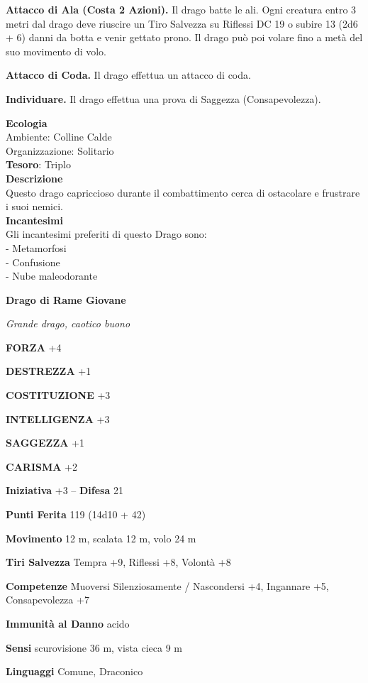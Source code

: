 \begin{multicols}{2}
\textbf{Attacco di Ala (Costa 2 Azioni).} Il drago batte le ali. Ogni creatura entro 3 metri dal drago deve riuscire un Tiro Salvezza su Riflessi DC 19 o subire 13 (2d6 + 6) danni da botta e venir gettato prono. Il drago può poi volare fino a metà del suo movimento di volo.

\textbf{Attacco di Coda.} Il drago effettua un attacco di coda.

\textbf{Individuare.} Il drago effettua una prova di Saggezza (Consapevolezza).

\textbf{Ecologia}\\
Ambiente: Colline Calde\\
Organizzazione: Solitario\\
\textbf{Tesoro}: Triplo\\
\textbf{Descrizione}\\
Questo drago capriccioso durante il combattimento cerca di ostacolare e frustrare i suoi nemici.\\
\textbf{Incantesimi}\\
Gli incantesimi preferiti di questo Drago sono:\\
- Metamorfosi\\
- Confusione\\
- Nube maleodorante


\medskip{}\textbf{Drago di Rame Giovane}

\textit{Grande drago, caotico buono}

\textbf{FORZA} +4

\textbf{DESTREZZA} +1

\textbf{COSTITUZIONE} +3

\textbf{INTELLIGENZA} +3

\textbf{SAGGEZZA} +1

\textbf{CARISMA} +2

\textbf{Iniziativa} +3 -- \textbf{Difesa} 21

\textbf{Punti Ferita} 119 (14d10 + 42)

\textbf{Movimento} 12 m, scalata 12 m, volo 24 m

\textbf{Tiri Salvezza} Tempra +9, Riflessi +8, Volontà +8

\textbf{Competenze} Muoversi Silenziosamente / Nascondersi +4, Ingannare +5, Consapevolezza +7

\textbf{Immunità al Danno} acido

\textbf{Sensi} scurovisione 36 m, vista cieca 9 m

\textbf{Linguaggi} Comune, Draconico


\end{multicols}
